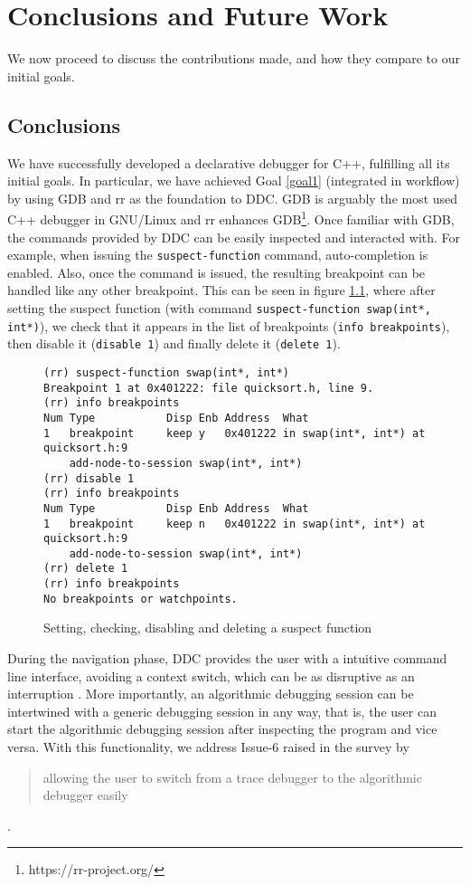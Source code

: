 \chapter{Conclusions and Future Work}
\label{cap:conclusions}

We now proceed to discuss the contributions made, and how they compare to our initial goals.

\section{Conclusions}
We have successfully developed a declarative debugger for C++, fulfilling all its initial goals.
In particular, we have achieved Goal \ref{goal1} (integrated in workflow) by using GDB and rr as the foundation to DDC. GDB is arguably the most used C++ debugger in GNU/Linux and rr enhances GDB\footnote{https://rr-project.org/}. Once familiar with GDB, the commands provided by DDC can be easily inspected and interacted with. For example, when issuing the \verb|suspect-function| command, auto-completion is enabled. Also, once the command is issued, the resulting breakpoint can be handled like any other breakpoint. This can be seen in figure \ref{fig:bpInteraction}, where after setting the suspect function (with command \verb|suspect-function swap(int*, int*)|), we check that it appears in the list of breakpoints (\verb|info breakpoints|), then disable it (\verb|disable 1|) and finally delete it (\verb|delete 1|).
\begin{figure}[h]
    \centering
    \caption{Setting, checking, disabling and deleting a suspect function}
    \label{fig:bpInteraction}
    \begin{verbatim}
(rr) suspect-function swap(int*, int*) 
Breakpoint 1 at 0x401222: file quicksort.h, line 9.
(rr) info breakpoints
Num Type           Disp Enb Address  What
1   breakpoint     keep y   0x401222 in swap(int*, int*) at quicksort.h:9
    add-node-to-session swap(int*, int*)
(rr) disable 1
(rr) info breakpoints
Num Type           Disp Enb Address  What
1   breakpoint     keep n   0x401222 in swap(int*, int*) at quicksort.h:9
    add-node-to-session swap(int*, int*)
(rr) delete 1
(rr) info breakpoints
No breakpoints or watchpoints.
    \end{verbatim}
\end{figure}

During the navigation phase, DDC provides the user with a intuitive command line interface, avoiding a context switch, which can be as disruptive as an interruption \cite{taskSwitching}.
More importantly, an algorithmic debugging session can be intertwined with a generic debugging session in any way, that is, the user can start the algorithmic debugging session after inspecting the program and vice versa. With this functionality, we address Issue-6 raised in the survey \cite{Survey} by \begin{quote}
    allowing the user to switch from a trace debugger to the algorithmic debugger easily
\end{quote}.


